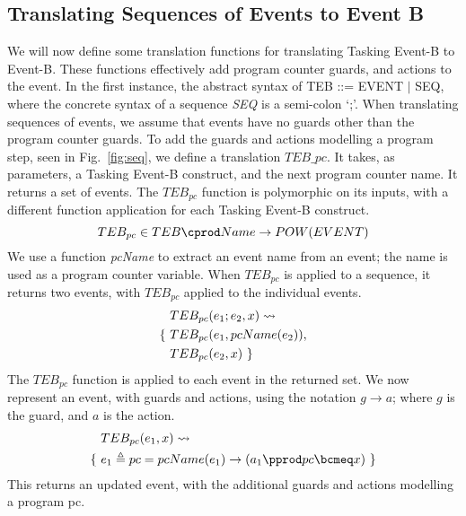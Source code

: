 \subsection{Translating Sequences of Events to Event B}
We will now define some translation functions for translating Tasking Event-B to Event-B. These functions effectively add program counter guards, and actions to the event. In the first instance, the abstract syntax of TEB ::= EVENT $|$ SEQ, where the concrete syntax of a sequence \emph{SEQ} is a semi-colon `;'. When translating sequences of events, we assume that events have no guards other than the program counter guards. To add the guards and actions modelling a program step, seen in Fig.~\ref{fig:seq}, we define a translation $TEB\_{pc}$. It takes, as parameters, a Tasking Event-B construct, and the next program counter name. It returns a set of events. The $TEB_{pc}$ function is polymorphic on its inputs, with a different function application for each Tasking Event-B construct.
%
\begin{equation}
TEB_{pc} \in  TEB \cprod Name \rightarrow POW(EVENT)
\notag
\end{equation}
%
We use a function \emph{pcName} to extract an event name from an event; the name is used as a program counter variable. When $TEB_{pc}$ is applied to a sequence, it returns two events, with $TEB_{pc}$ applied to the individual events. 
%
\begin{equation}
\begin{split}
&TEB_{pc}(e_1 ; e_2, x) \leadsto \\
\{~&TEB_{pc}(e_1, pcName(e_2)),\\
&TEB_{pc}(e_2, x)~\}
\end{split}
\notag
\end{equation}
%
The $TEB_{pc}$ function is applied to each event in the returned set. We now represent an event, with guards and actions, using the notation $g \rightarrow a$; where $g$ is the guard, and $a$ is the action. 
\begin{equation}
\begin{split}
&TEB_{pc}(e_1, x) \leadsto \\
\{~&e_1 \triangleq pc = pcName(e_1) \rightarrow ( a_1 \pprod pc \bcmeq x )~\}
\end{split}
\notag
\end{equation}
This returns an updated event, with the additional guards and actions modelling a program pc.

%  
